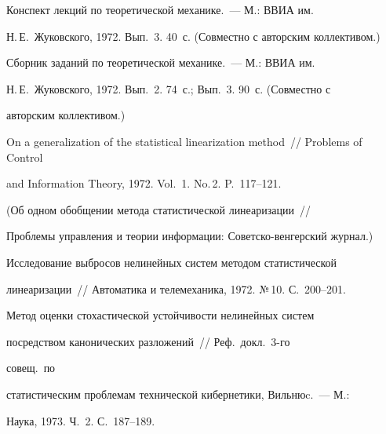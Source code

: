  Конспект лекций по теоретической механике.~--- М.: ВВИА им.\


Н.\,Е.~Жуковского, 1972. Вып.~3. 40~с. (Совместно с авторским коллективом.)





 Сборник заданий по теоретической механике.~--- М.: ВВИА им.\


Н.\,Е.~Жуковского, 1972. Вып.~2. 74~с.; Вып.~3. 90~с. (Совместно с


авторским коллективом.)





 On a generalization of the statistical linearization method~// Problems of Control


 and Information Theory, 1972. Vol.~1. No.\,2. P.~117--121.


(Об одном обобщении метода статистической линеаризации~//


Проблемы управления и теории информации: Со\-вет\-ско-вен\-гер\-ский журнал.)





 Исследование выбросов нелинейных систем методом статистической


линеаризации~// Автоматика и телемеханика, 1972. №\,10. С.~200--201.


\vspace*{-6pt}










 Метод оценки стохастической устойчивости нелинейных систем


посредством канонических разложений~// Реф.\ докл.\ 3-го\linebreak


\vspace*{-12pt}





\pagebreak





\noindent


 совещ.\ по


статистическим проблемам технической кибернетики, Вильнюc.~--- М.:


Наука, 1973. Ч.~2. С.~187--189.






